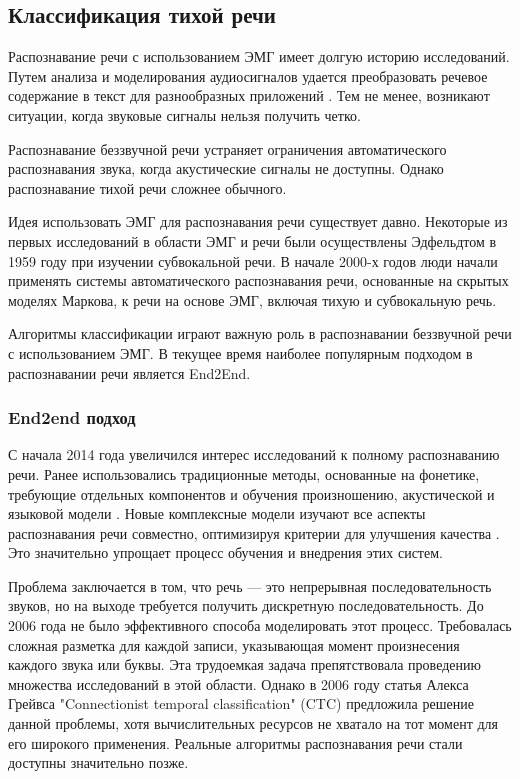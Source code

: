 \subsection{Классификация тихой речи}

Распознавание речи с использованием ЭМГ имеет долгую историю исследований. Путем анализа и моделирования аудиосигналов удается преобразовать речевое содержание в текст для разнообразных приложений \cite{bib:speech:1}. Тем не менее, возникают ситуации, когда звуковые сигналы нельзя получить четко.

Распознавание беззвучной речи устраняет ограничения автоматического распознавания звука, когда акустические сигналы не доступны. Однако распознавание тихой речи сложнее обычного.

Идея использовать ЭМГ для распознавания речи существует давно. Некоторые из первых исследований в области ЭМГ и речи были осуществлены Эдфельдтом в 1959 году при изучении субвокальной речи. В начале 2000-х годов люди начали применять системы автоматического распознавания речи, основанные на скрытых моделях Маркова, к речи на основе ЭМГ, включая тихую и субвокальную речь.

Алгоритмы классификации играют важную роль в распознавании беззвучной речи с использованием ЭМГ. В текущее время наиболее популярным подходом в распознавании речи является End2End.

\subsubsection{End2end подход}

С начала 2014 года увеличился интерес исследований к полному распознаванию речи. Ранее использовались традиционные методы, основанные на фонетике, требующие отдельных компонентов и обучения произношению, акустической и языковой модели \cite{bib:end-to-end:1}. Новые комплексные модели изучают все аспекты распознавания речи совместно, оптимизируя критерии для улучшения качества \cite{bib:end-to-end:2}. Это значительно упрощает процесс обучения и внедрения этих систем.

Проблема заключается в том, что речь — это непрерывная последовательность звуков, но на выходе требуется получить дискретную последовательность. До 2006 года не было эффективного способа моделировать этот процесс. Требовалась сложная разметка для каждой записи, указывающая момент произнесения каждого звука или буквы. Эта трудоемкая задача препятствовала проведению множества исследований в этой области. Однако в 2006 году статья Алекса Грейвса "Connectionist temporal classification" (CTC) предложила решение данной проблемы, хотя вычислительных ресурсов не хватало на тот момент для его широкого применения. Реальные алгоритмы распознавания речи стали доступны значительно позже.

